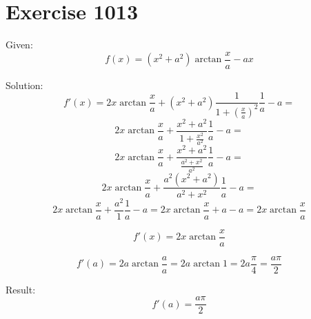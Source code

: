 \documentclass[a4paper, 10pt]{scrartcl}
\begin{document}
\section{Exercise 1013}

Given:
\[
f(x) = (x^{2} + a^{2})\arctan{\frac{x}{a}} - ax
\]

Solution:
\[
f'(x) = 2x\arctan{\frac{x}{a}} + (x^{2} + a^{2})\frac{1}{1 + (\frac{x}{a})^{2}}\frac{1}{a} - a =
\]
\[
2x\arctan{\frac{x}{a}} + \frac{x^{2} + a^{2}}{1 + \frac{x^{2}}{a^{2}}}\frac{1}{a} - a =
\]
\[
2x\arctan{\frac{x}{a}} + \frac{x^{2} + a^{2}}{\frac{a^{2} + x^{2}}{a^{2}}}\frac{1}{a} - a =
\]
\[
2x\arctan{\frac{x}{a}} + \frac{a^{2}(x^{2} + a^{2})}{a^{2} + x^{2}}\frac{1}{a} - a =
\]
\[
2x\arctan{\frac{x}{a}} + \frac{a^{2}}{1}\frac{1}{a} - a = 2x\arctan{\frac{x}{a}} + a - a = 2x\arctan{\frac{x}{a}}
\]

\[
f'(x) = 2x\arctan{\frac{x}{a}}
\]

\[
f'(a) = 2a\arctan{\frac{a}{a}} = 2a\arctan{1} = 2a\frac{\pi}{4} = \frac{a\pi}{2}
\]

Result:
\[
f'(a) = \frac{a\pi}{2}
\]
\end{document}
